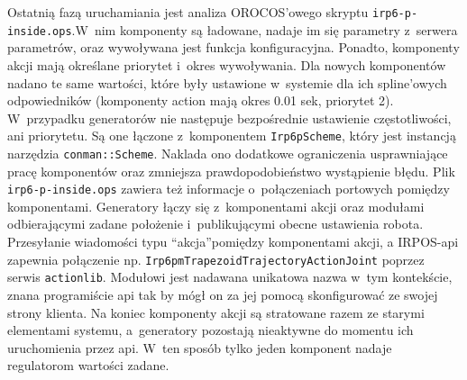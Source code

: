 \documentclass[a4paper, 12pt]{article}
\begin{document}
	\par
	Ostatnią fazą uruchamiania jest analiza OROCOS'owego skryptu \texttt{irp6-p-inside.ops}.\linebreak W~nim komponenty są ładowane, nadaje im się parametry z~serwera parametrów, oraz wywoływana jest funkcja konfiguracyjna. Ponadto, komponenty akcji mają określane priorytet i~okres wywoływania. Dla nowych komponentów nadano te same wartości, które były ustawione w~systemie dla ich spline'owych odpowiedników (komponenty action mają okres 0.01 sek, priorytet 2). W~przypadku generatorów nie następuje bezpośrednie ustawienie częstotliwości, ani priorytetu. Są one łączone z~komponentem \texttt{Irp6pScheme}, który jest instancją narzędzia \texttt{conman::Scheme}. Naklada ono dodatkowe ograniczenia usprawniające pracę komponentów oraz zmniejsza prawdopodobieństwo wystąpienie błędu. Plik \texttt{irp6-p-inside.ops} zawiera też informacje o~połączeniach portowych pomiędzy komponentami. Generatory łączy się z~komponentami akcji oraz modułami odbierającymi zadane położenie i~publikującymi obecne ustawienia robota. Przesyłanie wiadomości typu \textquotedblleft akcja\textquotedblright pomiędzy komponentami akcji, a IRPOS-api zapewnia połączenie np. \texttt{Irp6pmTrapezoidTrajectoryActionJoint} poprzez serwis \texttt{actionlib}.
	Modułowi jest nadawana unikatowa nazwa w~tym kontekście, znana programiście api tak by mógł on za jej pomocą skonfigurować ze swojej strony klienta. Na koniec komponenty akcji są stratowane razem ze starymi elementami systemu, a~generatory pozostają nieaktywne do momentu ich uruchomienia przez api. W~ten sposób tylko jeden komponent nadaje regulatorom wartości zadane.
	
\end{document}
